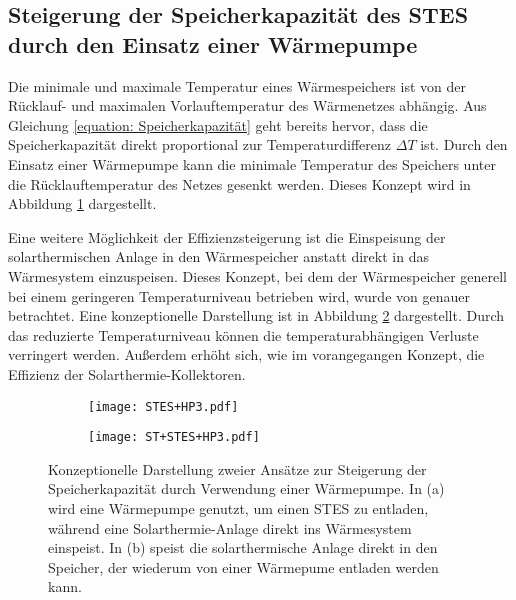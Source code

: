 \subsection*{Steigerung der Speicherkapazität des \ac{STES} durch den Einsatz einer Wärmepumpe}	
Die minimale und maximale Temperatur eines Wärmespeichers ist von der Rücklauf- und maximalen Vorlauftemperatur des Wärmenetzes abhängig. Aus Gleichung \ref{equation: Speicherkapazität} geht bereits hervor, dass die Speicherkapazität direkt proportional zur Temperaturdifferenz $\Delta T$ ist. Durch den Einsatz einer Wärmepumpe kann die minimale Temperatur des Speichers unter die Rücklauftemperatur des Netzes gesenkt werden. Dieses Konzept wird in Abbildung \ref{subfigure: STES+HP3} dargestellt. 

Eine weitere Möglichkeit der Effizienzsteigerung ist die Einspeisung der solarthermischen Anlage in den Wärmespeicher anstatt direkt in das Wärmesystem einzuspeisen. Dieses Konzept, bei dem der Wärmespeicher generell bei einem geringeren Temperaturniveau betrieben wird, wurde von \citet{MARX2014} genauer betrachtet. Eine konzeptionelle Darstellung ist in Abbildung \ref{figure: ST+STES+HP3} dargestellt. Durch das reduzierte Temperaturniveau können die temperaturabhängigen Verluste verringert werden. Außerdem erhöht sich, wie im vorangegangen Konzept, die Effizienz der Solarthermie-Kollektoren. 
	\begin{figure}
		\begin{subfigure}[b]{0.48\textwidth}
			\texttt{[image: STES+HP3.pdf]}
			\subcaption{}
			\label{subfigure: STES+HP3}
		\end{subfigure}
		\hfill
		\begin{subfigure}[b]{0.48\textwidth}
			\texttt{[image: ST+STES+HP3.pdf]}
			\subcaption{}
			\label{figure: ST+STES+HP3}
		\end{subfigure}
		\caption[Konzeptionelle Darstellung zweier Ansätze zur Steigerung der Speicherkapazität durch Verwendung einer Wärmepumpe]{Konzeptionelle Darstellung zweier Ansätze zur Steigerung der Speicherkapazität durch Verwendung einer Wärmepumpe. In (a) wird eine Wärmepumpe genutzt, um einen \ac{STES} zu entladen, während eine Solarthermie-Anlage direkt ins Wärmesystem einspeist. In (b) speist die solarthermische Anlage direkt in den Speicher, der wiederum von einer Wärmepume entladen werden kann.}
		\label{fig: STES+HP}
	\end{figure}

